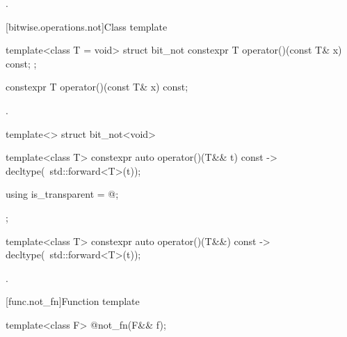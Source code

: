 \begin{itemdescr}
\pnum\returns {}.
\end{itemdescr}

[bitwise.operations.not]{Class template }

\begin{itemdecl}
template<class T = void> struct bit_not {
  constexpr T operator()(const T& x) const;
};
\end{itemdecl}

%
\begin{itemdecl}
constexpr T operator()(const T& x) const;
\end{itemdecl}

\begin{itemdescr}
\pnum\returns {}.
\end{itemdescr}

%
\begin{itemdecl}
template<> struct bit_not<void> {
  template<class T> constexpr auto operator()(T&& t) const
    -> decltype(~std::forward<T>(t));

  using is_transparent = @\unspec@;
};
\end{itemdecl}

%
\begin{itemdecl}
template<class T> constexpr auto operator()(T&&) const
    -> decltype(~std::forward<T>(t));
\end{itemdecl}

\begin{itemdescr}
\pnum\returns {}.
\end{itemdescr}


[func.not_fn]{Function template }

%
\begin{itemdecl}
template<class F> @\unspec@ not_fn(F&& f);
\end{itemdecl}

